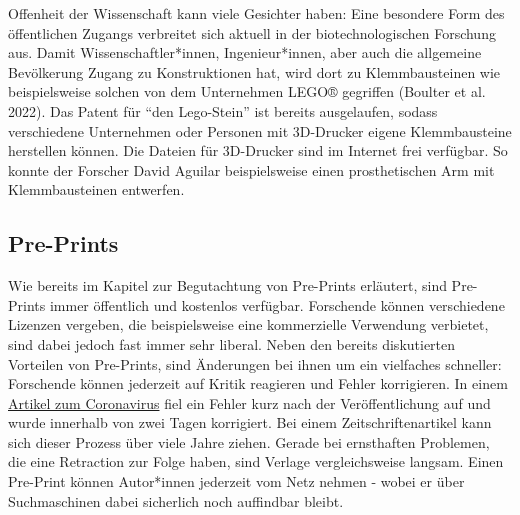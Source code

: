 \documentclass[
  letterpaper,
  DIV=11,
  numbers=noendperiod]{scrreprt}
\begin{document}
\begin{tcolorbox}[enhanced jigsaw, left=2mm, colback=white, colframe=quarto-callout-note-color-frame, opacitybacktitle=0.6, opacityback=0, title=\textcolor{quarto-callout-note-color}{\faInfo}\hspace{0.5em}{Offenheit durch Klemmbausteine}, toptitle=1mm, coltitle=black, colbacktitle=quarto-callout-note-color!10!white, titlerule=0mm, bottomtitle=1mm, leftrule=.75mm, breakable, rightrule=.15mm, bottomrule=.15mm, toprule=.15mm, arc=.35mm]

Offenheit der Wissenschaft kann viele Gesichter haben: Eine besondere
Form des öffentlichen Zugangs verbreitet sich aktuell in der
biotechnologischen Forschung aus. Damit Wissenschaftler*innen,
Ingenieur*innen, aber auch die allgemeine Bevölkerung Zugang zu
Konstruktionen hat, wird dort zu Klemmbausteinen wie beispielsweise
solchen von dem Unternehmen LEGO® gegriffen (Boulter et al. 2022). Das
Patent für ``den Lego-Stein'' ist bereits ausgelaufen, sodass
verschiedene Unternehmen oder Personen mit 3D-Drucker eigene
Klemmbausteine herstellen können. Die Dateien für 3D-Drucker sind im
Internet frei verfügbar. So konnte der Forscher David Aguilar
beispielsweise einen prosthetischen Arm mit Klemmbausteinen entwerfen.

\end{tcolorbox}

\subsection{Pre-Prints}\label{pre-prints}

Wie bereits im Kapitel zur Begutachtung von Pre-Prints erläutert, sind
Pre-Prints immer öffentlich und kostenlos verfügbar. Forschende können
verschiedene Lizenzen vergeben, die beispielsweise eine kommerzielle
Verwendung verbietet, sind dabei jedoch fast immer sehr liberal. Neben
den bereits diskutierten Vorteilen von Pre-Prints, sind Änderungen bei
ihnen um ein vielfaches schneller: Forschende können jederzeit auf
Kritik reagieren und Fehler korrigieren. In einem
\href{https://www.statnews.com/2020/02/03/retraction-faulty-coronavirus-paper-good-moment-for-science/}{Artikel
zum Coronavirus} fiel ein Fehler kurz nach der Veröffentlichung auf und
wurde innerhalb von zwei Tagen korrigiert. Bei einem
Zeitschriftenartikel kann sich dieser Prozess über viele Jahre ziehen.
Gerade bei ernsthaften Problemen, die eine Retraction zur Folge haben,
sind Verlage vergleichsweise langsam. Einen Pre-Print können Autor*innen
jederzeit vom Netz nehmen - wobei er über Suchmaschinen dabei sicherlich
noch auffindbar bleibt.
\end{document}
